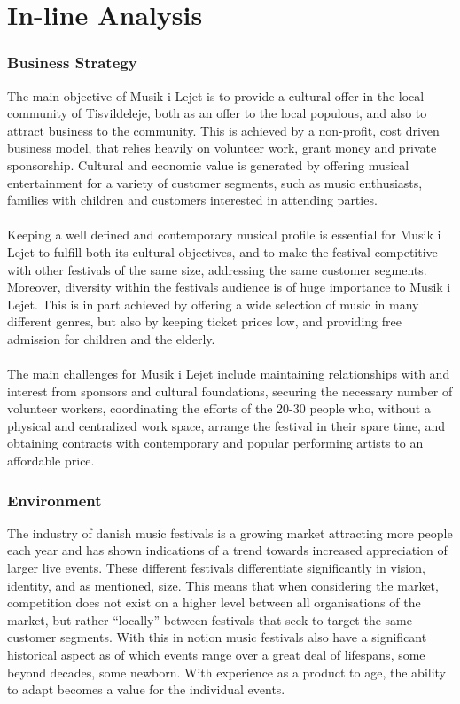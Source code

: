 \part{In-line Analysis}

\section{Business Strategy}
The main objective of Musik i Lejet is to provide a cultural offer in the local community of Tisvildeleje, both as an offer to the local populous, and also to attract business to the community. This is achieved by a non-profit, cost driven business model, that relies heavily on volunteer work, grant money and private sponsorship. Cultural and economic value is generated by offering musical entertainment for a variety of customer segments, such as music enthusiasts, families with children and customers interested in attending parties.
\\ \\
Keeping a well defined and contemporary musical profile is essential for Musik i Lejet to fulfill both its cultural objectives, and to make the festival competitive with other festivals of the same size, addressing the same customer segments. Moreover, diversity within the festivals audience is of huge importance to Musik i Lejet. This is in part achieved by offering a wide selection of music in many different genres, but also by keeping ticket prices low, and providing free admission for children and the elderly.
\\ \\
The main challenges for Musik i Lejet include maintaining relationships with and interest from sponsors and cultural foundations, securing the necessary number of volunteer workers, coordinating the efforts of the 20-30 people who, without a physical and centralized work space, arrange the festival in their spare time, and obtaining contracts with contemporary and popular performing artists to an affordable price.

\section{Environment}
The industry of danish music festivals is a growing market attracting more people each year and has shown indications of a trend towards increased appreciation of larger live events. These different festivals differentiate significantly in vision, identity, and as mentioned, size. This means that when considering the market, competition does not exist on a higher level between all organisations of the market, but rather “locally” between festivals that seek to target the same customer segments. With this in notion music festivals also have a significant historical aspect as of which events range over a great deal of lifespans, some beyond decades, some newborn. With experience as a product to age, the ability to adapt becomes a value for the individual events. 

